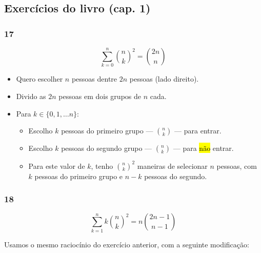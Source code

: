 \documentclass[
  11pt]{report}
\begin{document}
\hypertarget{exercuxedcios-do-livro-cap.-1-1}{%
\subsection*{Exercícios do livro (cap. 1)}\label{exercuxedcios-do-livro-cap.-1-1}}

\hypertarget{section-1}{%
\subsubsection*{17}\label{section-1}}

\begin{rmdbox}
\[
\sum_{k = 0}^n \binom{n}{k}^2 = \binom{2n}{n}
\]

\end{rmdbox}

\begin{itemize}
\item
  Quero escolher $n$ pessoas dentre $2n$ pessoas (lado direito).
\item
  Divido as $2n$ pessoas em dois grupos de $n$ cada.
\item
  Para $k \in \{0, 1, \ldots n\}$:

  \begin{itemize}
  \item
    Escolho $k$ pessoas do primeiro grupo --- $\binom{n}{k}$ --- para entrar.
  \item
    Escolho $k$ pessoas do segundo grupo --- $\binom{n}{k}$ --- para {\hl{não}} entrar.
  \item
    Para este valor de $k$, tenho $\binom{n}{k}^2$ maneiras de selecionar $n$ pessoas, com $k$ pessoas do primeiro grupo e $n-k$ pessoas do segundo.
  \end{itemize}
\end{itemize}

\hypertarget{section-2}{%
\subsubsection*{18}\label{section-2}}

\begin{rmdbox}
\[
\sum_{k = 1}^n k\binom{n}{k}^2 = n\binom{2n-1}{n-1}
\]

\end{rmdbox}

Usamos o mesmo raciocínio do exercício anterior, com a seguinte modificação:
\end{document}

